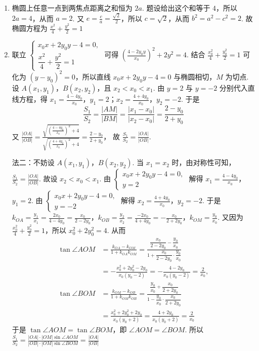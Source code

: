 \documentclass[UTF8,a4paper,oneside,11pt]{ctexbook}
\begin{document}
\begin{solution}
\begin{enumerate}
\item 椭圆上任意一点到两焦点距离之和恒为 \(2a\). 题设给出这个和等于 \(4\)，所以 \(2a=4\)，从而 \(a=2\). 又 \(e=\frac{c}{a}=\frac{\sqrt{2}}{2}\)，所以 \(c=\sqrt{2}\)，从而 \(b^2=a^2-c^2=2\). 故椭圆方程为
\(
\frac{x^2}{4}+\frac{y^2}{2}=1
\)

\item 联立 \(\begin{cases}
x_0x+2y_0y-4=0,\\[0.5ex]
\dfrac{x^2}{4}+\dfrac{y^2}{2}=1
\end{cases}\) 可得
\(\left(\frac{4-2y_0y}{x_0}\right)^2+2y^2=4\).
结合 \( \frac{x_0^2}{4}+\frac{y_0^2}{2}=1 \) 可化为 \( (y-y_0)^2=0 \)，所以直线 \(x_0x+2y_0y-4=0\) 与椭圆相切，\(M\) 为切点. 设 \(A(x_1,y_1)\)，\(B(x_2,y_2)\)，且 \(x_2<x_0<x_1\). 由 \(y=2\) 与 \(y=-2\) 分别代入直线方程，得 \(x_1=\frac{4-4y_0}{x_0}\)，\(y_1=2\)；\(x_2=\frac{4+4y_0}{x_0}\)，\(y_2=-2\). 于是
\[
\frac{S_1}{S_2}=\frac{|AM|}{|BM|}=\frac{|x_1-x_0|}{|x_2-x_0|}=\frac{2-y_0}{2+y_0}
\]
又
\(
\frac{|OA|}{|OB|}=\frac{\sqrt{\left(\frac{4-4y_0}{x_0}\right)^2+4}}{\sqrt{\left(\frac{4+4y_0}{x_0}\right)^2+4}}=\frac{2-y_0}{2+y_0}
\)，
故 \(\frac{S_1}{S_2}=\frac{|OA|}{|OB|}\).

法二：不妨设 \(A(x_1,y_1)\)，\(B(x_2,y_2)\). 当 \(x_1=x_2\) 时，由对称性可知，\(\frac{S_1}{S_2}=\frac{|OA|}{|OB|}\). 故设 \(x_2<x_0<x_1\). 由 \(\begin{cases}
x_0x+2y_0y-4=0,\\
y=2
\end{cases}\) 解得
\(x_1=\frac{4-4y_0}{x_0}\)，\(y_1=2\).
由 \(\begin{cases}
x_0x+2y_0y-4=0,\\
y=-2
\end{cases}\) 解得
\(x_2=\frac{4+4y_0}{x_0}\)，\(y_2=-2\). 于是 \(k_{OA}=\frac{y_1}{x_1}=\frac{2x_0}{4-4y_0}=\frac{x_0}{2-2y_0}\)，\(k_{OB}=\frac{y_2}{x_2}=\frac{-2x_0}{4+4y_0}=-\frac{x_0}{2+2y_0}\)，\(k_{OM}=\frac{y_0}{x_0}\).
又因为
\(\frac{x_0^2}{4}+\frac{y_0^2}{2}=1\)，所以 \(x_0^2+2y_0^2=4\). 从而
\begin{align*}
\tan\angle AOM&=\frac{k_{OA}-k_{OM}}{1+k_{OA}k_{OM}}
=\frac{\dfrac{x_0}{2-2y_0}-\dfrac{y_0}{x_0}}{1+\dfrac{x_0}{2-2y_0}\cdot\dfrac{y_0}{x_0}} \\
&=-\frac{x_0^2+2y_0^2-2y_0}{x_0(y_0-2)}=-\frac{4-2y_0}{x_0(y_0-2)}=\frac{2}{x_0}, \\
\tan\angle BOM&=\frac{k_{OM}-k_{OB}}{1+k_{OM}k_{OB}}
=\frac{\dfrac{y_0}{x_0}+\dfrac{x_0}{2+2y_0}}{1-\dfrac{y_0}{x_0}\cdot\dfrac{x_0}{2+2y_0}} \\
&=\frac{x_0^2+2y_0^2+2y_0}{x_0(y_0+2)}=\frac{4+2y_0}{x_0(y_0+2)}=\frac{2}{x_0}
\end{align*}
于是 \(\tan\angle AOM=\tan\angle BOM\)，即 \(\angle AOM=\angle BOM\). 所以
\(
\frac{S_1}{S_2}=\frac{|OA|\cdot |OM|\sin\angle AOM}{|OB|\cdot |OM|\sin\angle BOM}=\frac{|OA|}{|OB|}
\)
\end{enumerate}
\end{solution}
\end{document}
